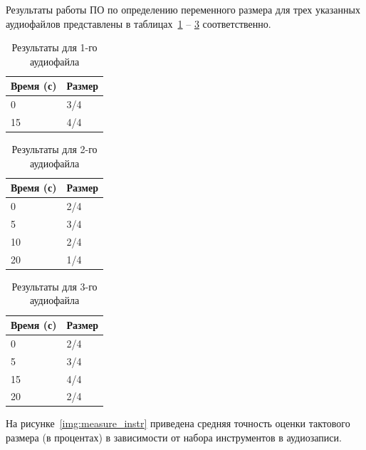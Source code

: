 
Результаты работы ПО по определению переменного размера для трех указанных аудиофайлов представлены в таблицах~\ref{tab:hz_drums} -- \ref{tab:hz_full} соответственно.

\begin{table}[!h]
	\begin{center}
		\caption{\label{tab:hz_drums}Результаты для 1-го аудиофайла}
		\begin{tabular}{|p{8cm}|p{8cm}|}
			\hline
			Время (с) & Размер\\
			\hline
			0 & 3/4\\
			\hline
			15 & 4/4\\
			\hline
		\end{tabular}
	\end{center}
\end{table}

\begin{table}[!h]
	\begin{center}
		\caption{\label{tab:hz_guitar}Результаты для 2-го аудиофайла}
		\begin{tabular}{|p{8cm}|p{8cm}|}
			\hline
			Время (с) & Размер\\
			\hline
			0 & 2/4\\
			\hline
			5 & 3/4\\
			\hline
			10 & 2/4\\
			\hline
			20 & 1/4\\
			\hline
		\end{tabular}
	\end{center}
\end{table}

\begin{table}[!h]
	\begin{center}
		\caption{\label{tab:hz_full}Результаты для 3-го аудиофайла}
		\begin{tabular}{|p{8cm}|p{8cm}|}
			\hline
			Время (с) & Размер\\
			\hline
			0 & 2/4\\
			\hline
			5 & 3/4\\
			\hline
			15 & 4/4\\
			\hline
			20 & 2/4\\
			\hline
		\end{tabular}
	\end{center}
\end{table}

\newpage

На рисунке~\ref{img:measure_instr} приведена средняя точность оценки тактового размера (в процентах) в зависимости от набора инструментов в аудиозаписи.

